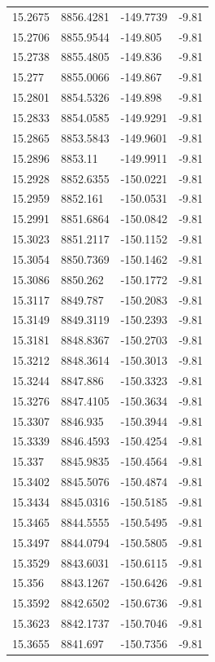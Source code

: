 \begin{table}[H]
\begin{tabular}{llll}
15.2675 & 8856.4281 & -149.7739 & -9.81 \\
15.2706 & 8855.9544 & -149.805 & -9.81 \\
15.2738 & 8855.4805 & -149.836 & -9.81 \\
15.277 & 8855.0066 & -149.867 & -9.81 \\
15.2801 & 8854.5326 & -149.898 & -9.81 \\
15.2833 & 8854.0585 & -149.9291 & -9.81 \\
15.2865 & 8853.5843 & -149.9601 & -9.81 \\
15.2896 & 8853.11 & -149.9911 & -9.81 \\
15.2928 & 8852.6355 & -150.0221 & -9.81 \\
15.2959 & 8852.161 & -150.0531 & -9.81 \\
15.2991 & 8851.6864 & -150.0842 & -9.81 \\
15.3023 & 8851.2117 & -150.1152 & -9.81 \\
15.3054 & 8850.7369 & -150.1462 & -9.81 \\
15.3086 & 8850.262 & -150.1772 & -9.81 \\
15.3117 & 8849.787 & -150.2083 & -9.81 \\
15.3149 & 8849.3119 & -150.2393 & -9.81 \\
15.3181 & 8848.8367 & -150.2703 & -9.81 \\
15.3212 & 8848.3614 & -150.3013 & -9.81 \\
15.3244 & 8847.886 & -150.3323 & -9.81 \\
15.3276 & 8847.4105 & -150.3634 & -9.81 \\
15.3307 & 8846.935 & -150.3944 & -9.81 \\
15.3339 & 8846.4593 & -150.4254 & -9.81 \\
15.337 & 8845.9835 & -150.4564 & -9.81 \\
15.3402 & 8845.5076 & -150.4874 & -9.81 \\
15.3434 & 8845.0316 & -150.5185 & -9.81 \\
15.3465 & 8844.5555 & -150.5495 & -9.81 \\
15.3497 & 8844.0794 & -150.5805 & -9.81 \\
15.3529 & 8843.6031 & -150.6115 & -9.81 \\
15.356 & 8843.1267 & -150.6426 & -9.81 \\
15.3592 & 8842.6502 & -150.6736 & -9.81 \\
15.3623 & 8842.1737 & -150.7046 & -9.81 \\
15.3655 & 8841.697 & -150.7356 & -9.81 \\

\end{tabular}
\end{table}
